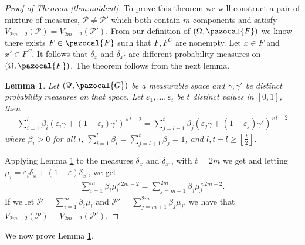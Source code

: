 \documentclass[aos]{imsart}
\def\sF{\pazocal{F}}
\def\sG{\pazocal{G}}
\def\sP{\mathscr{P}}
\theoremstyle{plain}
\newtheorem{lem}{Lemma}[section]
\theoremstyle{defintion}
\begin{document}
	\begin{proof}[Proof of Theorem \ref{thm:noident}]
		To prove this theorem we will construct a pair of mixture of measures, $\sP \neq \sP'$ which both contain $m$ components and satisfy $V_{2m-2}\left( \sP \right) = V_{2m-2}\left( \sP' \right)$. From our definition of $\left( \Omega, \sF \right)$ we know there exists $F\in \sF$ such that $F, F^C$ are nonempty. Let $x\in F$ and $x' \in F^C$. It follows that $\delta_{x}$ and $\delta_{x'}$ are different probability measures on $\left( \Omega, \sF \right)$. The theorem follows from the next lemma.
	\begin{lem}\label{lem:test}
		Let $\left( \Psi,\sG\right)$ be a measurable space and $\gamma, \gamma'$ be distinct probability measures on that space. Let $\varepsilon_1,\ldots,\varepsilon_t$ be $t$ distinct values in $\left[ 0,1 \right]$, then 
		\begin{eqnarray*}
			\sum_{i=1}^l \beta_i \left( \varepsilon_i \gamma + \left( 1-\varepsilon_i \right)\gamma' \right)^{\times t-2} = \sum_{j=l+1}^t \beta_j \left( \varepsilon_j \gamma + \left( 1-\varepsilon_j \right)\gamma' \right)^{\times t-2}
		\end{eqnarray*}
		where $\beta_i > 0$ for all $i$, $\sum_{i=1}^l \beta_i = \sum_{j=l+1}^t \beta_j = 1$, and $l,t- l \ge \left\lfloor\frac{t}{2}\right\rfloor$. 
	\end{lem}

	Applying Lemma \ref{lem:test} to the measures $\delta_x$ and $\delta_{x'}$, with $t=2m$ we get and letting $\mu_i = \varepsilon_i \delta_x + \left( 1-\varepsilon \right)\delta_{x'}$, we get 
	\begin{eqnarray*}
		\sum_{i=1}^m \beta_i \mu_i^{\times 2m-2} = \sum_{j=m+1}^{2m} \beta_j \mu_j^{\times 2m-2}.
	\end{eqnarray*}
	If we let $\sP = \sum_{i=1}^m \beta_i \mu_i$ and $\sP' = \sum_{j=m+1}^{2m} \beta_j \mu_j$, we have that $V_{2m-2}\left( \sP \right)= V_{2m-2}\left( \sP' \right)$.
	\end{proof}
	We now prove Lemma \ref{lem:test}.
\end{document}
